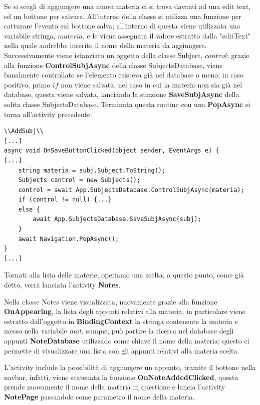 \documentclass[a4paper, 50pt, twoside]{article}
\begin{document}
Se si scegli di aggiungere una nuova materia ci si trova davanti ad una edit text, ed un bottone per salvare. All'interno della classe si utilizza una funzione per catturare l'evento sul bottone salva; all'interno di questa viene utilizzata una variabile stringa, $materia$, e le viene assegnata il valore estratto dalla "editText" nella quale andrebbe inserito il nome della materia da aggiungere. Successivamente viene istanziato un oggetto della classe Subject, $control$; grazie alla funzione \textbf{ControlSubjAsync} della classe SubjectsDatabase, viene banalmente controllato se l'elemento esisteva già nel database o meno; in caso positivo, primo $if$ non viene salvata, nel caso in cui la materia non sia già nel database, questa viene salvata, lanciando la sunzione \textbf{SaveSubjAsync} della solita classe SubjectsDatabase. Terminata questa routine con una \textbf{PopAsync} si torna all'activity precedente.

\begin{lstlisting}
\\AddSubj\\
[...]
async void OnSaveButtonClicked(object sender, EventArgs e) {
[...]
	string materia = subj.Subject.ToString();
	Subjects control = new Subjects();
	control = await App.SubjectsDatabase.ControlSubjAsync(materia);
	if (control != null) {...}
	else {
		await App.SubjectsDatabase.SaveSubjAsync(subj);
	}
	await Navigation.PopAsync();
}
[...]
\end{lstlisting}

Tornati alla lista delle materie, operiamo una scelta, a questo punto, come già detto, verrà lanciata l'activity \textbf{Notes}.

Nella classe Notes viene visualizzata, nuovamente grazie alla funzione \textbf{OnAppearing}, la lista degli appunti relativi alla materia, in particolare viene estratto dall'oggetto in \textbf{BindingContext} la stringa contenente la materia e messo nella variabile $mat$, sunque, può partire la ricerca nel database degli appunti \textbf{NoteDatabase} utilizzado come chiave il nome della materia; questo ci permette di visualizzare una lista con gli appunti relativi alla materia scelta.

L'activity include la possibilità di aggiungere un appunto, tramite il bottone nella navbar, infatti, viene scatenata la funzione \textbf{OnNoteAddedClicked}, questa prende nuovamente il nome della materia in questione e lancia l'activity \textbf{NotePage} passandole come parametro il nome della materia.
\end{document}
